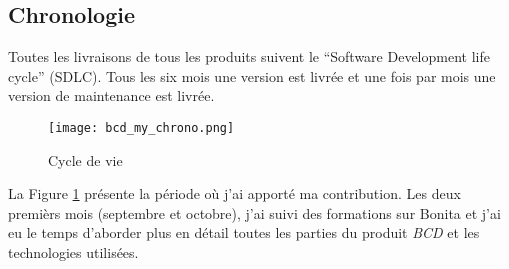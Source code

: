 \subsection{Chronologie}
Toutes les livraisons de tous les produits suivent le \enquote{Software Development life cycle} (SDLC). Tous les six mois une version est livrée et une fois par mois une version de maintenance est livrée.

\begin{figure}[!ht]
\centering
\texttt{[image: bcd\_my\_chrono.png]}
\caption{Cycle de vie}
\label{bcd_my_chrono}
\end{figure}

La Figure \ref{bcd_my_chrono} présente la période où j'ai apporté ma contribution. Les deux premièrs mois (septembre et octobre), j'ai suivi des formations sur Bonita et j'ai eu le temps d’aborder plus en détail toutes les parties du produit \emph{BCD} et les technologies utilisées.
